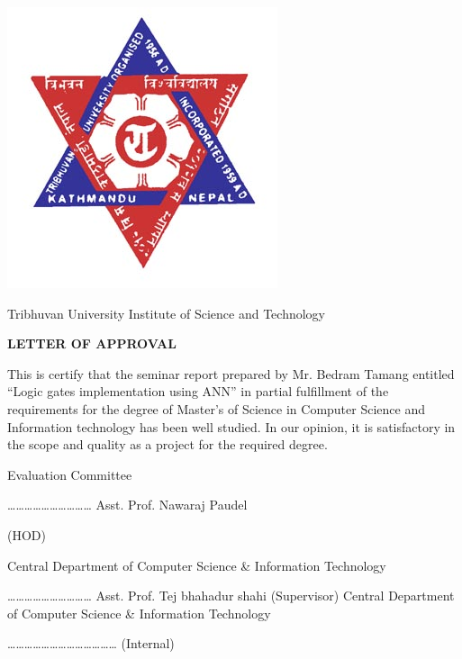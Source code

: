 
\begin{center}
\includegraphics[scale=0.5]{resources/logo.jpg}
\end{center}

\begin{center}
Tribhuvan University
\linebreak
Institute of Science and Technology 
\end{center}


\begin{center}
\vspace{2cm}
\textbf{
LETTER OF APPROVAL
}
\end{center}



\vspace{2cm}
This is certify that the seminar report prepared by Mr. Bedram Tamang entitled “Logic gates implementation using ANN” in partial fulfillment of the requirements for the degree of Master's of Science in Computer Science and Information technology has been well studied. In our opinion, it is satisfactory in the scope and quality as a project for the required degree. 


\begin{center}
Evaluation Committee
\end{center}

\begin{multicols}{2}
\begin{flushleft}
…………………………  \newline        
Asst. Prof. Nawaraj Paudel
\end{flushleft}
(HOD)
\begin{flushleft}	
Central Department of Computer\newline
Science \& Information Technology
\end{flushleft}	
\columnbreak
\begin{flushleft}
………………………… \newline
Asst. Prof. Tej bhahadur shahi	
(Supervisor) \newline	
Central Department of Computer \newline           
Science \& Information Technology        
\end{flushleft}
\end{multicols}


\vspace{1cm}
\begin{flushleft}
…………………………………\newline
  (Internal)
\end{flushleft}
\clearpage
